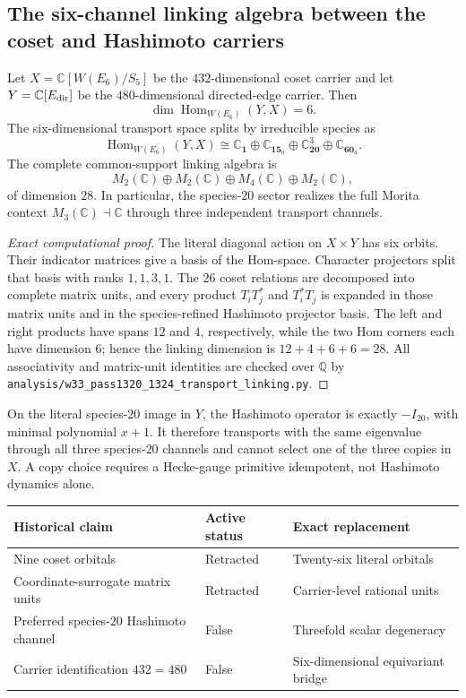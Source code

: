 \subsection{The six-channel linking algebra between the coset and Hashimoto carriers}
\begin{theorem}
Let $X=\mathbb C[W(E_6)/S_5]$ be the $432$-dimensional coset carrier and let
$Y=\mathbb C[E_{\rm dir}]$ be the $480$-dimensional directed-edge carrier.
Then
\[
 \dim\operatorname{Hom}_{W(E_6)}(Y,X)=6.
\]
The six-dimensional transport space splits by irreducible species as
\[
 \operatorname{Hom}_{W(E_6)}(Y,X)
 \cong \mathbb C_{\mathbf1}\oplus\mathbb C_{\mathbf{15}_a}
 \oplus\mathbb C^3_{\mathbf{20}}\oplus\mathbb C_{\mathbf{60}_a}.
\]
The complete common-support linking algebra is
\[
 M_2(\mathbb C)\oplus M_2(\mathbb C)\oplus M_4(\mathbb C)
 \oplus M_2(\mathbb C),
\]
of dimension $28$.  In particular, the species-$20$ sector realizes the full
Morita context $M_3(\mathbb C)\dashv\mathbb C$ through three independent
transport channels.
\end{theorem}
\begin{proof}[Exact computational proof]
The literal diagonal action on $X\times Y$ has six orbits.  Their indicator
matrices give a basis of the Hom-space.  Character projectors split that basis
with ranks $1,1,3,1$.  The $26$ coset relations are decomposed into complete
matrix units, and every product $T_iT_j^*$ and $T_i^*T_j$ is expanded in those
matrix units and in the species-refined Hashimoto projector basis.  The left
and right products have spans $12$ and $4$, respectively, while the two Hom
corners each have dimension $6$; hence the linking dimension is
$12+4+6+6=28$.  All associativity and matrix-unit identities are checked over
$\mathbb Q$ by
\texttt{analysis/w33\_pass1320\_1324\_transport\_linking.py}.
\end{proof}
\begin{remark}
On the literal species-$20$ image in $Y$, the Hashimoto operator is exactly
$-I_{20}$, with minimal polynomial $x+1$.  It therefore transports with the
same eigenvalue through all three species-$20$ channels and cannot select one
of the three copies in $X$.  A copy choice requires a Hecke-gauge primitive
idempotent, not Hashimoto dynamics alone.
\end{remark}
\begin{center}
\begin{tabular}{lll}
\toprule
Historical claim & Active status & Exact replacement\\
\midrule
Nine coset orbitals & Retracted & Twenty-six literal orbitals\\
Coordinate-surrogate matrix units & Retracted & Carrier-level rational units\\
Preferred species-$20$ Hashimoto channel & False & Threefold scalar degeneracy\\
Carrier identification $432=480$ & False & Six-dimensional equivariant bridge\\
\bottomrule
\end{tabular}
\end{center}
